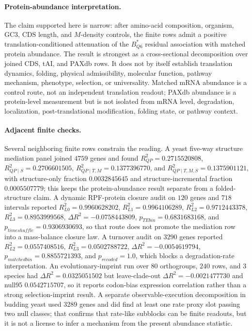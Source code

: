 \paragraph{Protein-abundance interpretation.}
The claim supported here is narrow: after amino-acid composition, organism, GC3, CDS length, and $M$-density controls, the finite rows admit a positive translation-conditioned attenuation of the $B^*_{Q6}$ residual association with matched protein abundance.  The result is strongest as a cross-sectional decomposition over joined CDS, tAI, and PAXdb rows.  It does not by itself establish translation dynamics, folding, physical admissibility, molecular function, pathway mechanism, phenotype, selection, or universality.  Matched mRNA abundance is a control route, not an independent translation readout; PAXdb abundance is a protein-level measurement but is not isolated from mRNA level, degradation, localization, post-translational modification, folding state, or pathway context.

\paragraph{Adjacent finite checks.}
Several neighboring finite rows constrain the reading.  A yeast five-way structure mediation panel joined $4759$ genes and found $R^2_{QP}=0.2715520808$, $R^2_{QP\mid S}=0.2706601505$, $R^2_{QP\mid T,M}=0.1377396770$, and $R^2_{QP\mid T,M,S}=0.1375901121$, with structure-only fraction $0.0032845645$ and structure-incremental fraction $0.0005507779$; this keeps the protein-abundance result separate from a folded-structure claim.  A dynamic RPF-protein closure audit on $120$ genes and $718$ intervals reported $R^2_{L0}=0.9960628202$, $R^2_{L1}=0.9964106289$, $R^2_{L2}=0.9712443378$, $R^2_{L3}=0.8953999568$, $\Delta R^2=-0.0758443809$, $p_{TEbin}=0.6831683168$, and $p_{timeshuffle}=0.9306930693$, so that route does not promote the mediation row into a mass-balance closure law.  A turnover audit on $3290$ genes reported $R^2_{L2}=0.0557408516$, $R^2_{L3}=0.0502788722$, $\Delta R^2=-0.0054619794$, $p_{matchedbin}=0.8855721393$, and $p_{recoded}=1.0$, which blocks a degradation-rate interpretation.  An evolutionary-imprint run over $80$ orthogroups, $240$ rows, and $3$ species had $\Delta R^2=0.0325051502$ but leave-clade-out $\Delta R^2=-0.0021477730$ and null95 $0.0542715707$, so it reports codon-bias expression correlation rather than a strong selection-imprint result.  A separate observable-execution decomposition in budding yeast used $3289$ genes and did find at least one rate proxy slot passing two null classes; that confirms that rate-like subblocks can be finite readouts, but it is not a license to infer a mechanism from the present abundance statistic.

